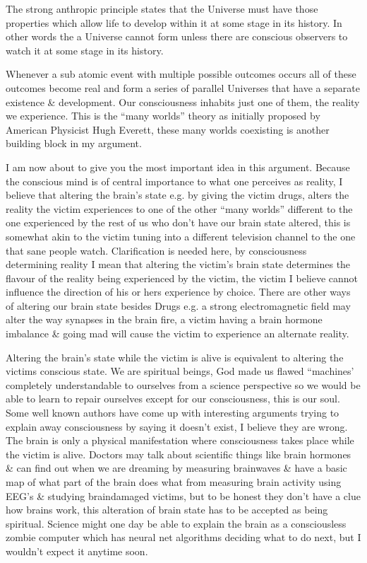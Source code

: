 \documentclass[twocolumn,showpacs,preprintnumbers,amsmath,amssymb]{revtex4}
\begin{document}
The strong anthropic principle states that 
the Universe must have those properties which allow life to 
develop within it at some stage in its history.
In other words the a Universe cannot form unless
there are conscious observers to watch it at some
stage in its history.

Whenever a sub atomic event with multiple possible outcomes
occurs all of these outcomes become real and form
a series of parallel Universes that have a separate
existence \& development. Our consciousness
inhabits just one of them, the reality we experience. 
This is the ``many worlds'' theory as initially proposed
by American Physicist Hugh Everett, these many worlds
coexisting is another building block in my argument.

I am now about to give you the most important idea in this argument.
Because the conscious mind is of central importance to what
one perceives as reality, I believe that altering the brain's state 
e.g. by giving the victim drugs, alters the 
reality the victim experiences to one of the other ``many worlds''
different to the one 
experienced by the rest of us who don't 
have our brain state altered, this is somewhat akin
to the victim tuning into a different television channel to
the one that sane people watch. Clarification is needed here,
by consciousness determining reality I mean that
altering the victim's brain state determines the flavour
of the reality being experienced by the victim, 
the victim I believe cannot influence the direction of his
or hers experience by choice.
There are other ways of altering our brain state
besides Drugs e.g. a strong electromagnetic
field may alter the way synapses in the brain fire, a victim
having a brain hormone imbalance \& going mad will cause
the victim to experience an alternate reality.

Altering the brain's state while the victim is alive 
is equivalent to altering the victims conscious state.
We are spiritual beings, God made us flawed ``machines'
completely understandable to ourselves from a science
perspective so we would be able to learn to repair ourselves
except for our consciousness, this is our soul.
Some well known authors have come up with
interesting arguments trying to explain away
consciousness by saying it doesn't exist,
I believe they are wrong.
The brain is only a physical manifestation where
consciousness takes place while the victim is alive.
Doctors may talk about scientific things like brain
hormones \& can find out when we are dreaming by 
measuring brainwaves \& have a basic map of
what part of the brain does what from
measuring brain activity using EEG's \& studying braindamaged
victims, but to be honest they don't have a clue how
brains work, this alteration of brain state has to be
accepted as being spiritual. Science might one day
be able to explain the brain as a consciousless
zombie computer which has neural net algorithms
deciding what to do next, but I wouldn't expect
it anytime soon.
\end{document}
